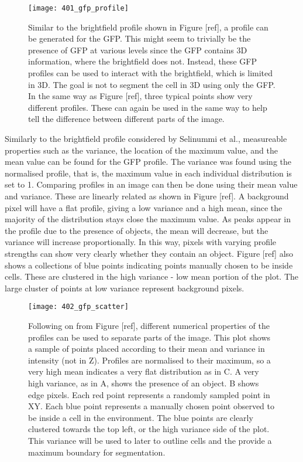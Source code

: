 \begin{figure}[p]
 \centering
 \texttt{[image: 401\_gfp\_profile]}
 \caption[The GFP profile]{
 	Similar to the brightfield profile shown in Figure [ref], a profile can be generated for the GFP. This might seem to trivially be the presence of GFP at various levels since the GFP contains 3D information, where the brightfield does not. Instead, these GFP profiles can be used to interact with the brightfield, which is limited in 3D. The goal is not to segment the cell in 3D using only the GFP. In the same way as Figure [ref], three typical points show very different profiles. These can again be used in the same way to help tell the difference between different parts of the image.
 }
 \label{fig:gfpprofile}
\end{figure}

Similarly to the brightfield profile considered by Selinummi et al., measureable properties such as the variance, the location of the maximum value, and the mean value can be found for the GFP profile. The variance was found using the normalised profile, that is, the maximum value in each individual distribution is set to 1. Comparing profiles in an image can then be done using their mean value and variance. These are linearly related as shown in Figure [ref]. A background pixel will have a flat profile, giving a low variance and a high mean, since the majority of the distribution stays close the maximum value. As peaks appear in the profile due to the presence of objects, the mean will decrease, but the variance will increase proportionally. In this way, pixels with varying profile strengths can show very clearly whether they contain an object. Figure [ref] also shows a collections of blue points indicating points manually chosen to be inside cells. These are clustered in the high variance - low mean portion of the plot. The large cluster of points at low variance represent background pixels.

\begin{figure}[p]
 \centering
 \texttt{[image: 402\_gfp\_scatter]}
 \caption[GFP scatter plot]{
 	Following on from Figure [ref], different numerical properties of the profiles can be used to separate parts of the image. This plot shows a sample of points placed according to their mean and variance in intensity (not in Z). Profiles are normalised to their maximum, so a very high mean indicates a very flat distribution as in C. A very high variance, as in A, shows the presence of an object. B shows edge pixels. Each red point represents a randomly sampled point in XY. Each blue point represents a manually chosen point observed to be inside a cell in the environment. The blue points are clearly clustered towards the top left, or the high variance side of the plot. This variance will be used to later to outline cells and the provide a maximum boundary for segmentation.
 }
 \label{fig:gfpscatter}
\end{figure}

